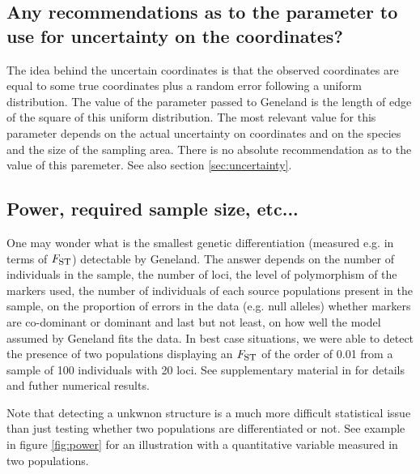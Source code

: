 \documentclass{article}
\newcommand{\Fst}{F_{\mbox{\footnotesize ST}}}
\begin{document}
\subsection[Parameter for uncertainty on coordinates]{Any recommendations as to the parameter to use for uncertainty on the coordinates?}\label{sec:faq_uncertainty}
The idea behind the uncertain coordinates is that the observed coordinates are equal 
to some true coordinates plus a random error following a uniform distribution. 
The value of the parameter passed to {\sc Geneland} is the length of edge of the square of this uniform distribution. 
The most relevant value for this parameter depends on the actual uncertainty on coordinates and on the 
species and the size of the sampling area. 
There is no absolute recommendation as to the value of this paremeter. See also section \ref{sec:uncertainty}. 


\subsection[Power]{Power, required sample size, etc...}
One may wonder what is the smallest genetic differentiation (measured e.g. in terms of $\Fst$) detectable by  {\sc Geneland}.
The answer depends on the number of individuals in the sample, the number of loci, the level of polymorphism of the markers used, 
the number of individuals of each source populations present in the sample, on the proportion of errors in the data (e.g. null alleles) 
whether markers are co-dominant or dominant and last but not least, on how well the model assumed by {\sc Geneland} fits the data.
In best case situations,  we were able to detect the presence of two populations displaying an $\Fst$ of the order of 0.01 
from a sample of 100 individuals with 20 loci. See supplementary material in \cite{Guillot08a} for details and futher numerical results. 

Note that detecting a unkwnon structure is a much more difficult statistical issue than just testing whether two populations 
are differentiated or not. See example in figure \ref{fig:power} for an illustration with a quantitative variable measured 
in two populations.
\end{document}
